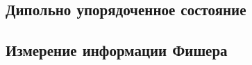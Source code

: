 \subsection{Дипольно упорядоченное состояние}

\subsection{Измерение информации Фишера}
%
%
%
%
%
%
%
%
